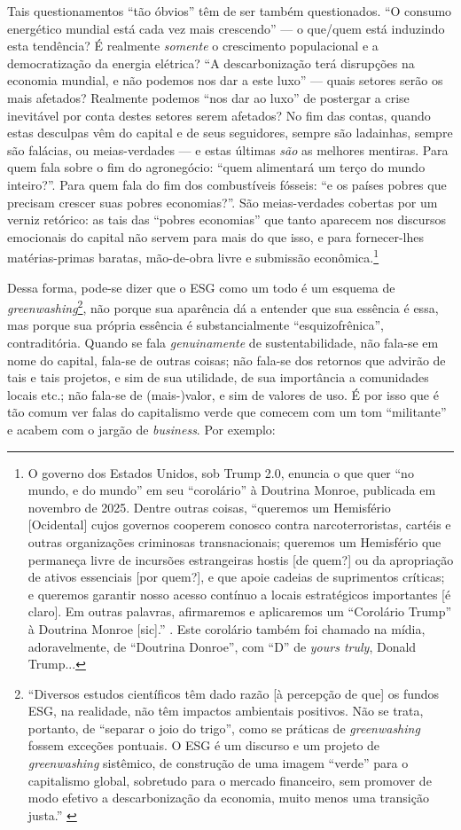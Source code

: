 \documentclass[12pt]{article}
\begin{document}
Tais questionamentos ``tão óbvios'' têm de ser também questionados. ``O consumo energético mundial está cada vez mais crescendo'' --- o que/quem está induzindo esta tendência? É realmente \textit{somente} o crescimento populacional e a democratização da energia elétrica? ``A descarbonização terá disrupções na economia mundial, e não podemos nos dar a este luxo'' --- quais setores serão os mais afetados? Realmente podemos ``nos dar ao luxo'' de postergar a crise inevitável por conta destes setores serem afetados? No fim das contas, quando estas desculpas vêm do capital e de seus seguidores, sempre são ladainhas, sempre são falácias, ou meias-verdades --- e estas últimas \textit{são} as melhores mentiras. Para quem fala sobre o fim do agronegócio: ``quem alimentará um terço do mundo inteiro?''. Para quem fala do fim dos combustíveis fósseis: ``e os países pobres que precisam crescer suas pobres economias?''.  São meias-verdades cobertas por um verniz retórico: as tais das ``pobres economias'' que tanto aparecem nos discursos emocionais do capital não servem para mais do que isso, e para fornecer-lhes matérias-primas baratas, mão-de-obra livre e submissão econômica.\footnote{O governo dos Estados Unidos, sob Trump 2.0, enuncia o que quer ``no mundo, e do mundo'' em seu ``corolário'' à Doutrina Monroe, publicada em novembro de 2025. Dentre outras coisas, ``queremos um Hemisfério [Ocidental] cujos governos cooperem conosco contra narcoterroristas, cartéis e outras organizações criminosas transnacionais; queremos um Hemisfério que permaneça livre de incursões estrangeiras hostis [de quem?] ou da apropriação de ativos essenciais [por quem?], e que apoie cadeias de suprimentos críticas; e queremos garantir nosso acesso contínuo a locais estratégicos importantes [é claro]. Em outras palavras, afirmaremos e aplicaremos um “Corolário Trump” à Doutrina Monroe [sic].'' \cite{WhiteHouse2025a}. Este corolário também foi chamado na mídia, adoravelmente, de ``Doutrina Donroe'', com ``D'' de \textit{yours truly}, Donald Trump...}


Dessa forma, pode-se dizer que o ESG como um todo é um esquema de
\textit{greenwashing}\footnote{``Diversos estudos científicos têm dado razão {[}à percepção de que{]} os fundos ESG, na realidade, não têm impactos ambientais positivos. Não se trata, portanto, de ``separar o joio do trigo'', como se práticas de
\textit{greenwashing} fossem exceções pontuais. O ESG é um discurso e um projeto de \textit{greenwashing} sistêmico, de construção de uma imagem ``verde'' para o capitalismo global, sobretudo para o mercado financeiro, sem promover de modo efetivo a descarbonização da economia, muito menos uma transição justa.'' \cite[p.~80]{Telesforo2025}}, não porque sua aparência dá a entender que sua essência é essa, mas porque sua própria essência é substancialmente ``esquizofrênica'', contraditória. Quando se fala \textit{genuinamente} de sustentabilidade, não fala-se em nome do capital, fala-se de outras coisas; não fala-se dos retornos que advirão de tais e tais projetos, e sim de sua utilidade, de sua importância a comunidades locais etc.; não fala-se de (mais-)valor, e sim de valores de uso. É por isso que é tão comum ver falas do capitalismo verde que comecem com um tom ``militante'' e acabem com o jargão de \textit{business}. Por exemplo:
\end{document}
